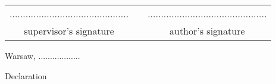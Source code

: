 \documentclass[a4paper,11pt,twoside,usenames,dvipsnames]{report}
\theoremstyle{definition}
\newcommand{\tytul}{Śledzenie rozproszonych systemów z elementami proweniencji}
\renewcommand{\title}{Provenance-enhanced distributed systems tracing}
\begin{document}
\sloppy
{}




\thispagestyle{empty}\newpage
\null

\vfill

\begin{center}
\begin{tabular}[t]{ccc}
............................................. & \hspace*{100pt} & .............................................\\
supervisor's signature & \hspace*{100pt} & author's signature
\end{tabular}
\end{center}




{
\begin{abstract}

\begin{center}
\title
\end{center}



\end{abstract}
}

\null\thispagestyle{empty}\newpage


{
\begin{abstract}

\begin{center}
\tytul
\end{center}



\end{abstract}
}




\null\thispagestyle{empty}\newpage

\null \hfill Warsaw, ..................\\

\par\vspace{5cm}

\begin{center}
Declaration
\end{center}
\end{document}
